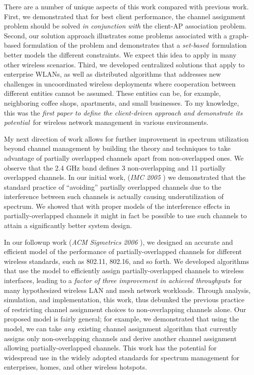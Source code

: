 \documentclass[11pt,letterpaper]{article}
\begin{document}
There are a number of unique aspects of this work compared with previous work.  First, we demonstrated that for best
client performance, the channel assignment problem should be solved {\em in conjunction with} the client-AP association
problem.  Second, our solution approach illustrates some problems associated with a graph-based formulation of the
problem and demonstrates that a {\em set-based}\ formulation better models the different constraints. We expect this
idea to apply in many other wireless scenarios.  Third, we developed centralized solutions that apply to enterprise
WLANs, as well as distributed algorithms that addresses new challenges in uncoordinated wireless deployments where
cooperation between different entities cannot be assumed. These entities can be, for example, neighboring coffee shops,
apartments, and small businesses.  To my knowledge, this was the {\em first paper to define the client-driven approach
and demonstrate its potential}\ for wireless network management in various environments.

 My next direction of work allows for further
improvement in spectrum utilization beyond channel management by building the theory and techniques to take advantage of
partially overlapped channels apart from non-overlapped ones.  We observe that the 2.4 GHz band defines 3
non-overlapping and 11 partially overlapped channels. In our initial work, ({\it IMC 2005 \cite{pov}}) we demonstrated that the
standard practice of ``avoiding'' partially overlapped channels due to the interference between such channels is
actually causing underutilization of spectrum.  We showed that with proper models of the interference effects in
partially-overlapped channels it might in fact be possible to use such channels to attain a significantly better system
design.

In our followup work ({\it ACM Sigmetrics 2006 \cite{simg2006}}), we designed an accurate and efficient model of the performance of
partially-overlapped channels for different wireless standards, such as 802.11, 802.16, and so forth. We developed
algorithms that use the model to efficiently assign partially-overlapped channels to wireless interfaces, leading to a
{\em factor of three improvement in achieved throughputs}\ for many hypothesized wireless LAN and mesh network
workloads. Through analysis, simulation, and implementation, this work, thus debunked the previous practice of
restricting channel assignment choices to non-overlapping channels alone. Our proposed model is fairly general; for
example, we demonstrated that using the model, we can take {\em any}\ existing channel assignment algorithm that
currently assigns only non-overlapping channels and derive another channel assignment allowing partially-overlapped
channels. This work has the potential for widespread use in the widely adopted standards for spectrum management for
enterprises, homes, and other wireless hotspots.
\end{document}
